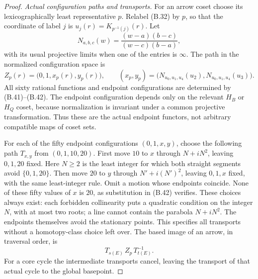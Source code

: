\begin{proof}
\emph{Actual configuration paths and transports.}
For an arrow coset choose its lexicographically least
representative $p$.  Relabel (B.32) by $p$, so that the
coordinate of label $j$ is $u_j(r)=K_{p^{-1}(j)}(r)$.
Let
\[
 N_{a,b,c}(w)=\frac{(w-a)(b-c)}{(w-c)(b-a)},
                                                               \tag{B.41}
\]
with its usual projective limits when one of the entries
is $\infty$.  The path in the normalized configuration space
is
\[
 Z_p(r)=\bigl(0,1,x_p(r),y_p(r)\bigr),\qquad
 (x_p,y_p)=\bigl(N_{u_0,u_1,u_4}(u_2),
                  N_{u_0,u_1,u_4}(u_3)\bigr).       \tag{B.42}
\]
All sixty rational functions and endpoint configurations
are determined by (B.41)--(B.42).  The endpoint configuration
depends only on the relevant $H_B$ or $H_Q$ coset, because
normalization is invariant under a common projective
transformation.  Thus these are the actual endpoint functors,
not arbitrary compatible maps of coset sets.

For each of the fifty endpoint configurations $(0,1,x,y)$,
choose the following path $T_{x,y}$ from $(0,1,10,20)$.
First move $10$ to $x$ through $N+iN^2$, leaving $0,1,20$
fixed.  Here $N\geq2$ is the least integer for which both
straight segments avoid $\{0,1,20\}$.  Then move $20$ to
$y$ through $N'+i(N')^2$, leaving $0,1,x$ fixed, with the
same least-integer rule.  Omit a motion whose endpoints
coincide.  None of these fifty values of $x$ is $20$, as
substitution in (B.42) verifies.  These choices always
exist: each forbidden collinearity puts a quadratic
condition on the integer $N$, with at most two roots;
a line cannot contain the parabola $N+iN^2$.  The endpoints
themselves avoid the stationary points.  This specifies
all transports without a homotopy-class choice left over.
The based image of an arrow, in traversal order, is
\[
 T_{s(E)}\,Z_p\,T_{t(E)}^{-1}.                     \tag{B.43}
\]
For a core cycle the intermediate transports cancel, leaving
the transport of that actual cycle to the global basepoint.


\end{proof}
